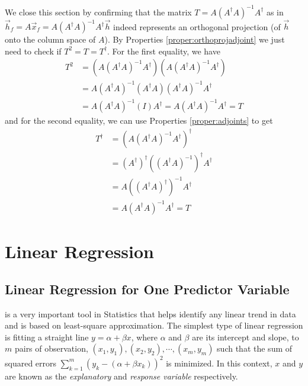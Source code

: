 We close this section by confirming that the matrix $T = A(A^\dag A)^{-1}A^\dag$ as in $\vec{h}_f = A\vec{x}_f = A(A^\dag A)^{-1}A^\dag \vec{h}$ indeed represents an orthogonal projection (of $\vec{h}$ onto the column space of $A$). By Properties \ref{proper:orthoprojadjoint} we just need to check if $T^2 = T = T^\dag$. For the first equality, we have
\begin{align*}
T^2 &= (A(A^\dag A)^{-1}A^\dag)(A(A^\dag A)^{-1}A^\dag) \\
&= A(A^\dag A)^{-1}(A^\dag A)(A^\dag A)^{-1}A^\dag \\
&= A(A^\dag A)^{-1}(I)A^\dag = A(A^\dag A)^{-1}A^\dag = T
\end{align*}
and for the second equality, we can use Properties \ref{proper:adjoints} to get
\begin{align*}
T^\dag &= (A(A^\dag A)^{-1}A^\dag)^\dag \\
&= (A^\dag)^\dag((A^\dag A)^{-1})^\dag A^\dag \\
&= A ((A^\dag A)^\dag)^{-1} A^\dag \\
&= A (A^\dag A)^{-1} A^\dag = T
\end{align*}

\section{Linear Regression}
\subsection{Linear Regression for One Predictor Variable}

 is a very important tool in Statistics that helps identify any linear trend in data and is based on least-square approximation. The simplest type of linear regression is fitting a straight line $y = \alpha + \beta x$, where $\alpha$ and $\beta$ are its intercept and slope, to $m$ pairs of observation, $(x_1, y_1), (x_2, y_2), \cdots, (x_m, y_m)$ such that the sum of squared errors $\sum_{k=1}^m (y_k - (\alpha + \beta x_k))^2$ is minimized. In this context, $x$ and $y$ are known as the \textit{explanatory} and \textit{response variable} respectively.\par

